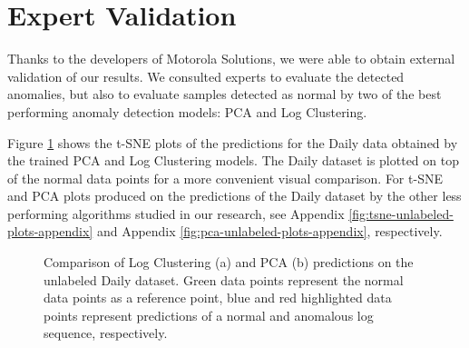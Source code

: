 \section{Expert Validation}

Thanks to the developers of Motorola Solutions, we were able to obtain external validation of our results. We consulted experts to evaluate the detected anomalies, but also to evaluate samples detected as normal by two of the best performing anomaly detection models: PCA and Log Clustering.

Figure \ref{fig:expert-validation-unlabeled-plots} shows the t-SNE plots of the predictions for the Daily data obtained by the trained PCA and Log Clustering models. The Daily dataset is plotted on top of the normal data points for a more convenient visual comparison. For t-SNE and PCA plots produced on the predictions of the Daily dataset by the other less performing algorithms studied in our research, see Appendix \ref{fig:tsne-unlabeled-plots-appendix} and Appendix \ref{fig:pca-unlabeled-plots-appendix}, respectively. 
\begin{figure}
    \centering 
    \qquad 
    \caption{Comparison of Log Clustering (a) and PCA (b) predictions on the unlabeled Daily dataset. Green data points represent the normal data points as a reference point, blue and red highlighted data points represent predictions of a normal and anomalous log sequence, respectively.} 
    \label{fig:expert-validation-unlabeled-plots}
\end{figure}

